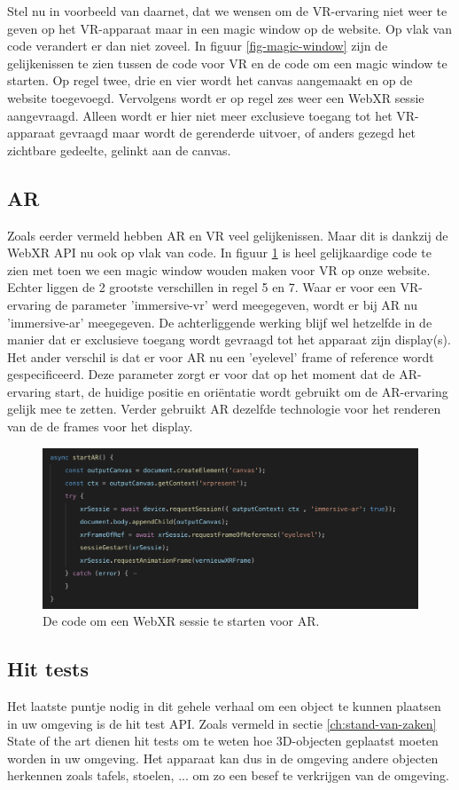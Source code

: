 Stel nu in voorbeeld van daarnet, dat we wensen om de VR-ervaring niet weer te geven op het VR-apparaat maar in een magic window op de website. Op vlak van code verandert er dan niet zoveel. In figuur \ref{fig-magic-window} zijn de gelijkenissen te zien tussen de code voor VR en de code om een magic window te starten. Op regel twee, drie en vier wordt het canvas aangemaakt en op de website toegevoegd. Vervolgens wordt er op regel zes weer een WebXR sessie aangevraagd. Alleen wordt er hier niet meer exclusieve toegang tot het VR-apparaat gevraagd maar wordt de gerenderde uitvoer, of anders gezegd het zichtbare gedeelte, gelinkt aan de canvas.   


\subsection{AR}
\label{sec:AR}
Zoals eerder vermeld hebben AR en VR veel gelijkenissen. Maar dit is dankzij de WebXR API nu ook op vlak van code. In figuur \ref{fig-start-ar} is heel gelijkaardige code te zien met toen we een magic window wouden maken voor VR op onze website. Echter liggen de 2 grootste verschillen in regel 5 en 7. Waar er voor een VR-ervaring de parameter 'immersive-vr' werd meegegeven, wordt er bij AR nu 'immersive-ar' meegegeven. De achterliggende werking blijf wel hetzelfde in de manier dat er exclusieve toegang wordt gevraagd tot het apparaat zijn display(s). Het ander verschil is dat er voor AR nu een 'eyelevel' frame of reference wordt gespecificeerd. Deze parameter zorgt er voor dat op het moment dat de AR-ervaring start, de huidige positie en oriëntatie wordt gebruikt om de AR-ervaring gelijk mee te zetten. Verder gebruikt AR dezelfde technologie voor het renderen van de de frames voor het display. 

\begin{figure}
	\includegraphics[width=\linewidth]{img/startAR.png}
	\caption{De code om een WebXR sessie te starten voor AR.}
	\label{fig-start-ar}
\end{figure}

\subsection{Hit tests}
\label{src:hit-tests}
Het laatste puntje nodig in dit gehele verhaal om een object te kunnen plaatsen in uw omgeving is de hit test API. Zoals vermeld in sectie \ref{ch:stand-van-zaken} State of the art dienen hit tests om te weten hoe 3D-objecten geplaatst moeten worden in uw omgeving. Het apparaat kan dus in de omgeving andere objecten herkennen zoals tafels, stoelen, ... om zo een besef te verkrijgen van de omgeving.


